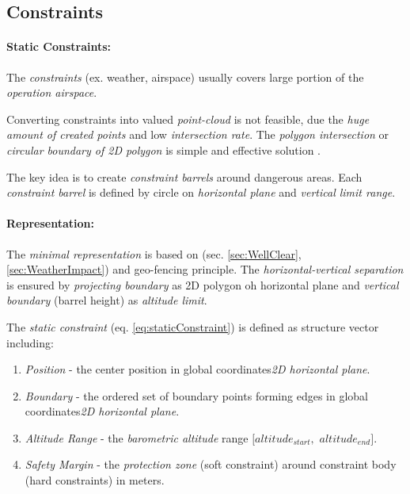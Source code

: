 \subsection{Constraints}\label{s:virtualConstraints}
\paragraph{Static Constraints:} The \emph{constraints} (ex. weather, airspace) usually covers large portion of the \emph{operation airspace}. 

Converting constraints into valued \emph{point-cloud} is not feasible, due the \emph{huge amount of created points} and low \emph{intersection rate}. The \emph{polygon intersection} or \emph{circular boundary of 2D polygon} is simple and effective solution \cite{ritter1990efficient,welzl1991smallest}. 

The key idea is to create \emph{constraint barrels} around dangerous areas. Each \emph{constraint barrel} is defined by circle on \emph{horizontal plane} and \emph{vertical limit range}.

\paragraph{Representation:} The \emph{minimal representation} is based on (sec. \ref{sec:WellClear}, \ref{sec:WeatherImpact}) and geo-fencing principle. The \emph{horizontal-vertical separation} is ensured by \emph{projecting boundary} as 2D polygon oh horizontal plane and \emph{vertical boundary} (barrel height) as \emph{altitude limit}. 

The \emph{static constraint} (eq. \ref{eq:staticConstraint}) is defined as structure vector including:
\begin{enumerate}
    \item \emph{Position} - the center position in global coordinates\emph{2D horizontal plane}.
    
    \item \emph{Boundary} - the ordered set of boundary points forming edges in global coordinates\emph{2D horizontal plane}.
    
    \item \emph{Altitude Range} - the \emph{barometric altitude} range $[altitude_{start},$ $altitude_{end}]$.
    
    \item \emph{Safety Margin} - the \emph{protection zone} (soft constraint) around constraint body (hard constraints) in meters.
\end{enumerate}

